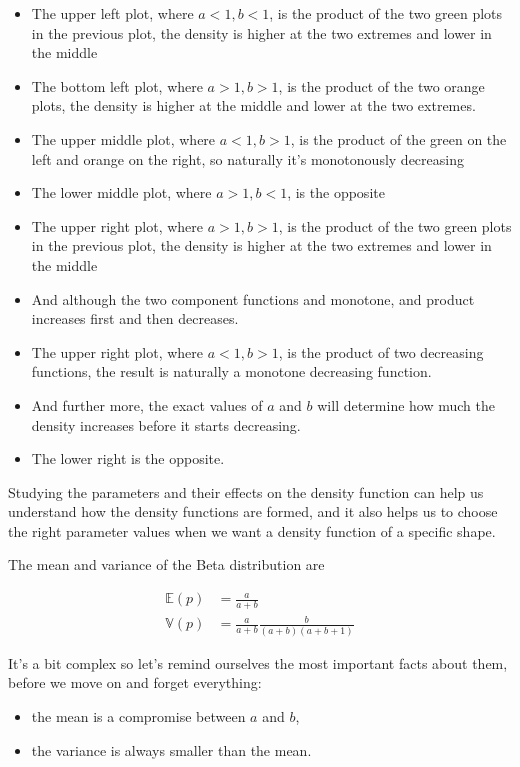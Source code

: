 \documentclass[11pt]{article}
\begin{document}
\begin{itemize}
\item The upper left plot, where \(a<1, b<1\), is the product of the two green plots in the previous plot, the density is higher at the two extremes and lower in the middle
\item The bottom left plot, where \(a>1, b>1\), is the product of the two orange plots, the density is higher at the middle and lower at the two extremes.
\item The upper middle plot, where \(a<1, b>1\), is the product of the green on the left and orange on the right, so naturally it's monotonously decreasing
\item The lower middle plot, where \(a>1, b<1\), is the opposite
\item The upper right plot, where \(a>1, b>1\), is the product of the two green plots in the previous plot, the density is higher at the two extremes and lower in the middle
\item And although the two component functions and monotone, and product increases first and then decreases.
\item The upper right plot, where \(a\lt1, b\gt1\), is the product of two decreasing functions, the result is naturally a monotone decreasing function.
\item And further more, the exact values of \(a\) and \(b\) will determine how much the density increases before it starts decreasing.
\item The lower right is the opposite.
\end{itemize}

Studying the parameters and their effects on the density function can help us understand how the density functions are formed, and it also helps us to choose the right parameter values when we want a density function of a specific shape.

The mean and variance of the Beta distribution are

\begin{align*}
\mathbb{E}(p) &= \frac{a}{a+b} \\
\mathbb{V}(p) &= \frac{a}{a+b} \frac{b}{(a+b)(a+b+1)}
\end{align*}

It's a bit complex so let's remind ourselves the most important facts about them, before we move on and forget everything:

\begin{itemize}
\item the mean is a compromise between \(a\) and \(b\),
\item the variance is always smaller than the mean.
\end{itemize}
\end{document}
